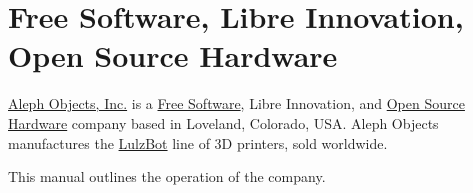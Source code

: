%
%
%
%
%

\section{Free Software, Libre Innovation, Open Source Hardware}

\href{https://www.alephobjects.com/}{Aleph Objects, Inc.} is a
\href{https://www.fsf.org/}{Free Software},
Libre Innovation, and
\href{http://www.oshwa.org/}{Open Source Hardware}
company based in Loveland, Colorado, USA. Aleph Objects
manufactures the
\href{https://www.lulzbot.com/}{LulzBot} line of 3D printers, sold worldwide.

This manual outlines the operation of the company.

